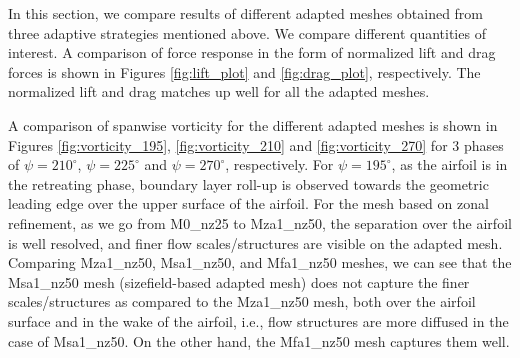 In this section, we compare results of different adapted meshes obtained from three adaptive strategies mentioned above. 
We compare different quantities of interest. 
A comparison of force response in the form of normalized lift and drag forces is shown in Figures \ref{fig:lift_plot} and \ref{fig:drag_plot}, respectively. The normalized lift and drag matches up well for all the adapted meshes.

A comparison of spanwise vorticity for the different adapted meshes is shown in Figures \ref{fig:vorticity_195}, \ref{fig:vorticity_210} and \ref{fig:vorticity_270} for 3 phases of $\psi=210^\circ$, $\psi=225^\circ$ and $\psi=270^\circ$, respectively.
For $\psi=195^\circ$, as the airfoil is in the retreating phase, boundary layer roll-up is observed towards the geometric leading edge over the upper surface of the airfoil.
For the mesh based on zonal refinement, as we go from M0\_nz25 to Mza1\_nz50, the separation over the airfoil is well resolved, and finer flow scales/structures are visible on the adapted mesh.
Comparing Mza1\_nz50, Msa1\_nz50, and Mfa1\_nz50 meshes, we can see that the Msa1\_nz50 mesh (sizefield-based adapted mesh) does not capture the finer scales/structures as compared to the Mza1\_nz50 mesh, both over the airfoil surface and in the wake of the airfoil, i.e., flow structures are more diffused in the case of Msa1\_nz50.
On the other hand, the Mfa1\_nz50 mesh captures them well.

